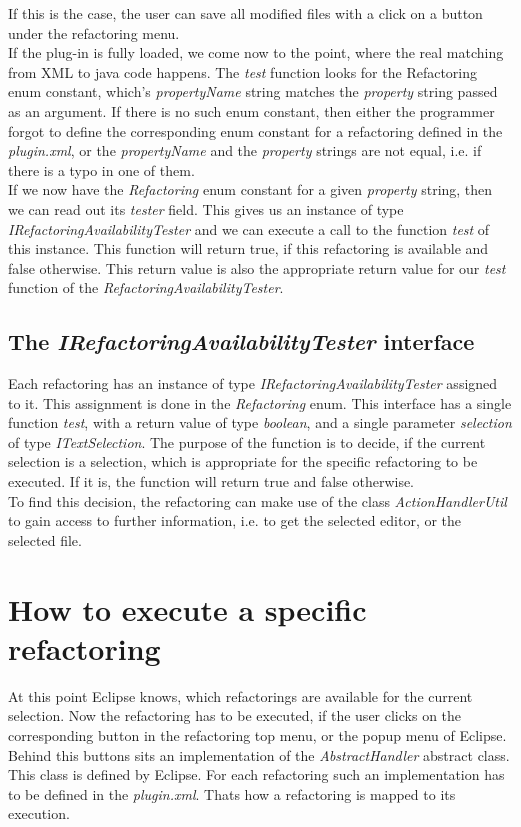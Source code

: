 \documentclass[a4paper,10pt]{report}
\begin{document}
If this is the case, the user can save all modified files with a click on a button under the refactoring menu. \\
If the plug-in is fully loaded, we come now to the point, where the real matching from XML to java code happens.
The {\it test} function looks for the {Refactoring} enum constant, which's {\it propertyName} string matches the {\it property} string passed as an argument.
If there is no such enum constant, then either the programmer forgot to define the corresponding enum constant for a refactoring defined in the {\it plugin.xml},
or the {\it propertyName} and the {\it property} strings are not equal, i.e. if there is a typo in one of them.\\
If we now have the {\it Refactoring} enum constant for a given {\it property} string, then we can read out its {\it tester} field.
This gives us an instance of type {\it IRefactoringAvailabilityTester} and we can execute a call to the function {\it test} of this instance.
This function will return true, if this refactoring is available and false otherwise.
This return value is also the appropriate return value for our {\it test} function of the {\it RefactoringAvailabilityTester}.

\subsection{The {\it IRefactoringAvailabilityTester} interface}
Each refactoring has an instance of type {\it IRefactoringAvailabilityTester} assigned to it.
This assignment is done in the {\it Refactoring} enum.
This interface has a single function {\it test}, with a return value of type {\it boolean}, and a single parameter {\it selection} of type {\it ITextSelection}.
The purpose of the function is to decide, if the current selection is a selection, which is appropriate for the specific refactoring to be executed.
If it is, the function will return true and false otherwise.\\
To find this decision, the refactoring can make use of the class {\it ActionHandlerUtil} to gain access to further information, i.e. to get the selected editor, or the selected file.\\


\section{How to execute a specific refactoring}
At this point Eclipse knows, which refactorings are available for the current selection.
Now the refactoring has to be executed, if the user clicks on the corresponding button in the refactoring top menu, or the popup menu of Eclipse.
Behind this buttons sits an implementation of the {\it AbstractHandler} abstract class. This class is defined by Eclipse.
For each refactoring such an implementation has to be defined in the {\it plugin.xml}. Thats how a refactoring is mapped to its execution.
\end{document}
